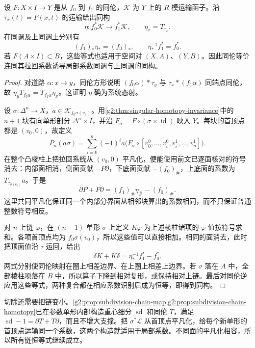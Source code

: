 \begin{theorem}\label{g2:thm:twisted-homotopy-invariance}
	设 \(F:X\times I\to Y\) 是从 \(f_0\) 到 \(f_1\) 的同伦，\(\mathcal K\) 为 \(Y\) 上的 \(R\) 模运输函子。沿 \(\tau_x(t)=F(x,t)\) 的运输给出同构
	\[
		\eta:f_0^*\mathcal K\longrightarrow f_1^*\mathcal K,\qquad \eta_x=T_{\tau_x}.
	\]
	在同调及上同调上分别有
	\[
		(f_1)_*\eta_*=(f_0)_*,\qquad
		\eta_*^{-1}f_1^*=f_0^*.
	\]
	若 \(F(A\times I)\subset B\)，这些等式也适用于空间对 \((X,A)\)、\((Y,B)\)。因此同伦等价连同其拉回系数诱导局部系数同调与上同调的同构。
\end{theorem}
\begin{proof}
	对道路 \(\alpha:x\to y\)，同伦方形说明 \((f_0\alpha)*\tau_y\) 与 \(\tau_x*(f_1\alpha)\) 同端点同伦，故 \(\eta_yT_{f_0\alpha}=T_{f_1\alpha}\eta_x\)。这证明 \(\eta\) 确为系统态射。

	设 \(\sigma:\Delta^n\to X\)，\(a\in\mathcal K_{f_0\sigma(v_0)}\)。用\cref{g2:thm:singular-homotopy-invariance}中的 \(n+1\) 块有向单形剖分 \(\Delta^n\times I\)，并沿 \(F_\sigma=F\circ(\sigma\times\operatorname{id})\) 映入 \(Y\)。每块的首顶点都是 \((v_0,0)\)，故定义
	\[
		P_n(a\sigma)=\sum_{i=0}^n(-1)^i a\bigl(F_\sigma\circ[v_0^0,\ldots,v_i^0,v_i^1,\ldots,v_n^1]\bigr).
	\]
	在整个凸棱柱上把拉回系统从 \((v_0,0)\) 平凡化，便能使用前文已逐面核对的符号消去：内部面相消，侧面贡献 \(-P\partial\)，下底面贡献 \(-(f_0)_\#\)，上底面的系数为 \(T_{\tau_{\sigma(v_0)}}a\)。于是
	\[
		\partial P+P\partial=(f_1)_\#\eta_\#-(f_0)_\#.
	\]
	这里共同平凡化保证同一个内部分界面从相邻块算出的系数相同，而不只保证普通整数符号相反。

	对 \(n\) 上链 \(\varphi\)，在 \((n-1)\) 单形 \(\sigma\) 上定义 \(K\varphi\) 为上述棱柱诸项的 \(\varphi\) 值按符号求和。各项首顶点均为 \(f_0\sigma(v_0)\)，所以这些值可以直接相加。相同的面消去，此时把顶面值沿 \(\tau\) 运回，给出
	\[
		\delta K+K\delta=\eta_*^{-1}f_1^*-f_0^*.
	\]
	两式分别使同伦映射在圈上相差边界、在上圈上相差上边界。若 \(\sigma\) 落在 \(A\) 中，全部棱柱项落在 \(B\) 中，所以算子下降到相对复形，或保持相对上链。最后对同伦逆应用这些等式，两种复合都在相应系数识别后成为恒等，即得到同构。
\end{proof}

切除还需要把链变小。\cref{g2:prop:subdivision-chain-map,g2:prop:subdivision-chain-homotopy}已在参数单形内部构造重心细分 \(\operatorname{sd}\) 和同伦 \(T\)，满足 \(\operatorname{sd}-1=\partial T+T\partial\)，而且不增大支撑。把 \(\sigma^*\mathcal L\) 从首顶点平凡化，给每个新单形的首顶点运输同一个系数，这两个构造就适用于局部系数。不同面的平凡化相容，所以所有链恒等式继续成立。

